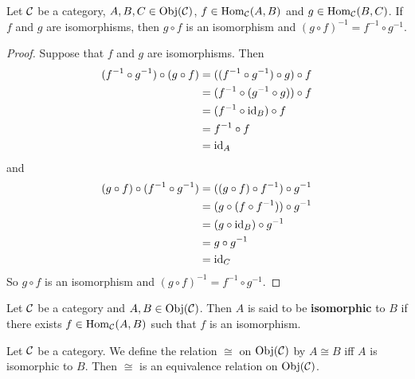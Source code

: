 \documentclass{book}
\begin{document}
	\begin{ex} 
		Let $\mathcal{C}$ be a category, $A,B,C \in \operatorname{Obj}(\mathcal{C})$, $f \in \operatorname{Hom}_{\mathcal{C}}(A, B)$ and $g \in \operatorname{Hom}_{\mathcal{C}}(B, C)$. If $f$ and $g$ are isomorphisms, then $g \circ f$ is an isomorphism and $(g \circ f)^{-1} = f^{-1} \circ g^{-1}$. 
	\end{ex}
	
	\begin{proof}
		Suppose that $f$ and $g$ are isomorphisms. Then 
		\begin{align*}
			(f^{-1} \circ g^{-1}) \circ (g \circ f) 
			& = ((f^{-1} \circ g^{-1}) \circ g) \circ f \\
			& = (f^{-1} \circ (g^{-1} \circ g)) \circ f \\
			& = (f^{-1} \circ \operatorname{id}_B) \circ f \\
			& = f^{-1} \circ f \\
			& = \operatorname{id}_{A}
		\end{align*}
		and 
		\begin{align*}
			(g \circ f) \circ (f^{-1} \circ g^{-1}) 
			& = ((g \circ f) \circ f^{-1}) \circ g^{-1} \\
			& = (g \circ (f \circ f^{-1})) \circ g^{-1} \\
			& = (g \circ \operatorname{id}_{B}) \circ g^{-1} \\
			& = g \circ  g^{-1} \\
			& = \operatorname{id}_{C}
		\end{align*}
		So $g \circ f$ is an isomorphism and $(g \circ f)^{-1} = f^{-1} \circ g^{-1}$.
	\end{proof}
	
	\begin{defn} 
		Let $\mathcal{C}$ be a category and $A,B \in \operatorname{Obj}(\mathcal{C})$. Then $A$ is said to be \textbf{isomorphic} to $B$ if there exists $f \in \operatorname{Hom}_{\mathcal{C}}(A, B)$ such that $f$ is an isomorphism. 
	\end{defn}
	
	\begin{ex} 
		Let $\mathcal{C}$ be a category. We define the relation $\cong$ on $\operatorname{Obj}(\mathcal{C})$ by $A \cong B$ iff $A$ is isomorphic to $B$. Then $\cong$ is an equivalence relation on $\operatorname{Obj}(\mathcal{C})$.
	\end{ex}
	
\end{document}
